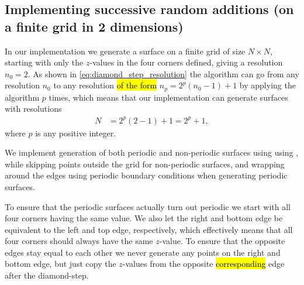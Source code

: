 \subsection{Implementing successive random additions (on a finite grid in 2 dimensions)}
In our implementation we generate a surface on a finite grid of size $N\times N$, starting with only the $z$-values in the four corners defined, giving a resolution $n_0 = 2$. As shown in \cref{eq:diamond_step_resolution} the algorithm can go from any resolution $n_0$ to any resolution \hl{of the form} $n_p = 2^p(n_0-1) + 1$ by applying the algorithm $p$ times, which means that our implementation can generate surfaces with resolutions
\begin{align*}
    N &= 2^p(2-1) + 1 = 2^p + 1,
\end{align*}
where $p$ is any positive integer.

We implement generation of both periodic and non-periodic surfaces using using , while skipping points outside the grid for non-periodic surfaces, and wrapping around the edges using periodic boundary conditions when generating periodic surfaces.

To ensure that the periodic surfaces actually turn out periodic we start with all four corners having the same value. We also let the right and bottom edge be equivalent to the left and top edge, respectively, which effectively means that all four corners should always have the same $z$-value. To ensure that the opposite edges stay equal to each other we never generate any points on the right and bottom edge, but just copy the $z$-values from the opposite \hl{corresponding} edge after the diamond-step.

